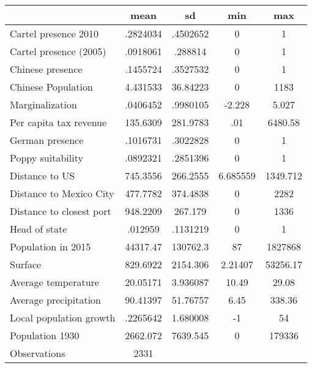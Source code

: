 {
\def\sym#1{\ifmmode^{#1}\else\(^{#1}\)\fi}
\begin{tabular}{l*{1}{cccc}}
\hline\hline
                    &        mean&          sd&         min&         max\\
\hline
Cartel presence 2010&    .2824034&    .4502652&           0&           1\\
Cartel presence (2005)&    .0918061&     .288814&           0&           1\\
Chinese presence    &    .1455724&    .3527532&           0&           1\\
Chinese Population  &    4.431533&    36.84223&           0&        1183\\
Marginalization     &    .0406452&    .9980105&      -2.228&       5.027\\
Per capita tax revenue&    135.6309&    281.9783&         .01&     6480.58\\
German presence     &    .1016731&    .3022828&           0&           1\\
Poppy suitability   &    .0892321&    .2851396&           0&           1\\
Distance to US      &    745.3556&    266.2555&    6.685559&    1349.712\\
Distance to Mexico City&    477.7782&    374.4838&           0&        2282\\
Distance to closest port&    948.2209&     267.179&           0&        1336\\
Head of state       &     .012959&    .1131219&           0&           1\\
Population in 2015  &    44317.47&    130762.3&          87&     1827868\\
Surface             &    829.6922&    2154.306&     2.21407&    53256.17\\
Average temperature &    20.05171&    3.936087&       10.49&       29.08\\
Average precipitation&    90.41397&    51.76757&        6.45&      338.36\\
Local population growth&    .2265642&    1.680008&          -1&          54\\
Population 1930     &    2662.072&    7639.545&           0&      179336\\
\hline
Observations        &        2331&            &            &            \\
\hline\hline
\end{tabular}
}

